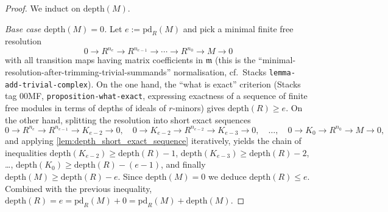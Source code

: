 \begin{proof}
  
  
  
\leanok
  We induct on \(\text{depth}(M)\).

  \emph{Base case \(\text{depth}(M) = 0\).} Let \(e := \text{pd}_R(M)\) and pick a minimal
  finite free resolution
  \[
    0 \longrightarrow R^{n_e} \longrightarrow R^{n_{e-1}} \longrightarrow
    \cdots \longrightarrow R^{n_0} \longrightarrow M \longrightarrow 0
  \]
  with all transition maps having matrix coefficients in \(\mathfrak{m}\) (this is the
  ``minimal-resolution-after-trimming-trivial-summands'' normalisation, cf.\ Stacks
  \texttt{lemma-add-trivial-complex}). On the one hand, the ``what is exact'' criterion
  (Stacks tag 00MF, \texttt{proposition-what-exact}, expressing exactness of a sequence of
  finite free modules in terms of depths of ideals of \(r\)-minors) gives
  \(\text{depth}(R) \geq e\). On the other hand, splitting the resolution into short exact
  sequences
  \[
    0 \to R^{n_e} \to R^{n_{e-1}} \to K_{e-2} \to 0, \quad
    0 \to K_{e-2} \to R^{n_{e-2}} \to K_{e-3} \to 0, \quad \dots, \quad
    0 \to K_0 \to R^{n_0} \to M \to 0,
  \]
  and applying \cref{lem:depth_short_exact_sequence} iteratively,
  yields the chain of inequalities
  \(\text{depth}(K_{e-2}) \geq \text{depth}(R) - 1\),
  \(\text{depth}(K_{e-3}) \geq \text{depth}(R) - 2\), \dots,
  \(\text{depth}(K_0) \geq \text{depth}(R) - (e-1)\), and finally
  \(\text{depth}(M) \geq \text{depth}(R) - e\). Since \(\text{depth}(M) = 0\) we deduce
  \(\text{depth}(R) \leq e\). Combined with the previous inequality, $\text{depth}(R) = e =
  \text{pd}_R(M) + 0 = \text{pd}_R(M) + \text{depth}(M)$.


\end{proof}
